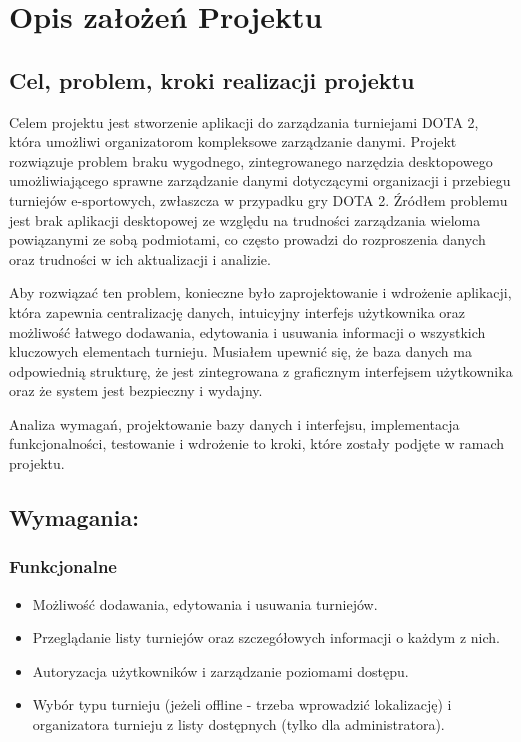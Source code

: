 \chapter{Opis założeń Projektu}
\label{cha:opisZalozenProjektu}

\section{Cel, problem, kroki realizacji projektu}

Celem projektu jest stworzenie aplikacji do zarządzania turniejami DOTA 2, która umożliwi organizatorom kompleksowe zarządzanie danymi.  Projekt rozwiązuje problem braku wygodnego, zintegrowanego narzędzia desktopowego umożliwiającego sprawne zarządzanie danymi dotyczącymi organizacji i przebiegu turniejów e-sportowych, zwłaszcza w przypadku gry DOTA 2.  Źródłem problemu jest brak aplikacji desktopowej ze względu na trudności zarządzania wieloma powiązanymi ze sobą podmiotami, co często prowadzi do rozproszenia danych oraz trudności w ich aktualizacji i analizie.

Aby rozwiązać ten problem, konieczne było zaprojektowanie i wdrożenie aplikacji, która zapewnia centralizację danych, intuicyjny interfejs użytkownika oraz możliwość łatwego dodawania, edytowania i usuwania informacji o wszystkich kluczowych elementach turnieju. Musiałem upewnić się, że baza danych ma odpowiednią strukturę, że jest zintegrowana z graficznym interfejsem użytkownika oraz że system jest bezpieczny i wydajny.

Analiza wymagań, projektowanie bazy danych i interfejsu, implementacja funkcjonalności, testowanie i wdrożenie to kroki, które zostały podjęte w ramach projektu.

\section{Wymagania:}
\subsection{Funkcjonalne}

\begin{itemize}
    \item Możliwość dodawania, edytowania i usuwania turniejów.
    \item Przeglądanie listy turniejów oraz szczegółowych informacji o każdym z nich.
    \item Autoryzacja użytkowników i zarządzanie poziomami dostępu.
    \item Wybór typu turnieju (jeżeli offline - trzeba wprowadzić lokalizację) i organizatora turnieju z listy dostępnych (tylko dla administratora).
\end{itemize}
